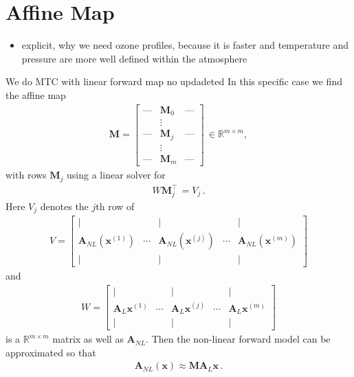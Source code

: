 \section{Affine Map}
\begin{itemize}
	\item explicit, why we need ozone profiles, because it is faster and temperature and pressure are more well defined within the atmosphere
\end{itemize}
We do MTC with linear forward map no updadeted
In this specific case we find the affine map
\begin{align}
	\bm{M} = \begin{bmatrix}
		\text{---} & \bm{M}_0 &   \text{---}  \\
		&  \vdots  & \\
		\text{---}& \bm{M}_j &  \text{---} \\
		&  \vdots  & \\
		\text{---} & \bm{M}_m &   \text{---}
	\end{bmatrix} \, \in \mathbb{R}^{m \times m} ,
\end{align}
with rows $\bm{M}_j$ using a linear solver for
\begin{align}
	W \bm{M}_j^\top \, = V_{j} \, .
\end{align}
Here $V_j$ denotes the $j$th row of  
\begin{align}
	V = \begin{bmatrix}
		\vert&   &  \vert & & \vert \\
		\bm{A}_{NL} (\bm{x}^{(1)} ) &  \cdots& \bm{A}_{NL} (\bm{x}^{(j)} )&  \cdots & \bm{A}_{NL} (\bm{x}^{(m)})  \\
		\vert&   &  \vert & & \vert 
	\end{bmatrix}
\end{align}
and
\begin{align}
	W = \begin{bmatrix}
		\vert&   &  \vert & & \vert \\
		\bm{A}_{L} \bm{x}^{(1)} &  \cdots& \bm{A}_{L} \bm{x}^{(j)} &  \cdots & \bm{A}_{L} \bm{x}^{(m)} \\
		\vert&   &  \vert & & \vert 
	\end{bmatrix}
\end{align}
is a $\mathbb{R}^{m \times m} $ matrix as well as $\bm{A}_{NL}$.
Then the non-linear forward model can be approximated so that
\begin{align}
	\bm{A}_{NL}(\bm{x}) \approx \bm{M A}_L \bm{x}\, .
\end{align}

